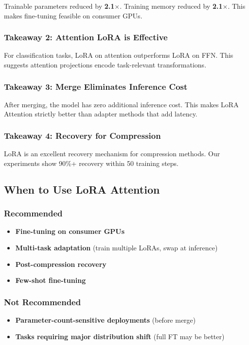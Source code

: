 Trainable parameters reduced by \textbf{2.1$\times$}. Training memory 
reduced by \textbf{2.1$\times$}. This makes fine-tuning feasible on consumer 
GPUs.

\subsubsection{Takeaway 2: Attention LoRA is Effective}

For classification tasks, LoRA on attention outperforms LoRA on FFN. This 
suggests attention projections encode task-relevant transformations.

\subsubsection{Takeaway 3: Merge Eliminates Inference Cost}

After merging, the model has zero additional inference cost. This makes 
LoRA Attention strictly better than adapter methods that add latency.

\subsubsection{Takeaway 4: Recovery for Compression}

LoRA is an excellent recovery mechanism for compression methods. Our 
experiments show 90\%+ recovery within 50 training steps.

\subsection{When to Use LoRA Attention}

\subsubsection{Recommended}
\begin{itemize}
\item \textbf{Fine-tuning on consumer GPUs}
\item \textbf{Multi-task adaptation} (train multiple LoRAs, swap at inference)
\item \textbf{Post-compression recovery}
\item \textbf{Few-shot fine-tuning}

\end{itemize}
\subsubsection{Not Recommended}
\begin{itemize}
\item \textbf{Parameter-count-sensitive deployments} (before merge)
\item \textbf{Tasks requiring major distribution shift} (full FT may be better)

\end{itemize}
